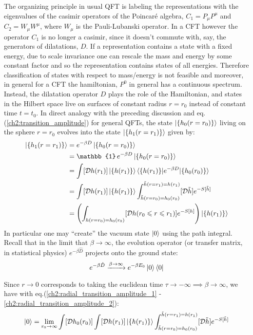   
  The organizing principle in usual QFT is labeling the representations with the eigenvalues of the casimir operators of the Poincar\'{e} algebra, $C_1=P_\mu P^\mu$ and $C_2=W_\mu W^\mu$, where $W_\mu$ is the Pauli-Lubanski operator. In a CFT however the operator $C_1$ is no longer a casimir, since it doesn't commute with, say, the generators of dilatations, $D$. If a representation contains a state with a fixed energy, due to scale invariance one can rescale the mass and energy by some constant factor and so the representation contains states of all energies. Therefore classification of states with respect to mass/energy is not feasible and moreover, in general for a CFT the hamiltonian, $P^0$ in general has a continuous spectrum. Instead, the dilatation operator $D$ plays the role of the Hamiltonian, and states in the Hilbert space live on surfaces of constant radius $r=r_0$ instead of constant time $t=t_0$. In direct analogy with the preceding discussion and eq. (\ref{ch2:transition_amplitude}) for general QFTs, the state $\ket{\{h_0(r=r_0)\}}$ living on the sphere $r=r_0$ evolves into the state $\ket{\{h_1(r=r_1)\}}$ given by:
  \begin{align} 
   \ket{\{h_1(r=r_1)\}} &= e^{-\beta D} \ket{\{h_0(r=r_0)\}} \label{ch2:radial_transition_amplitude_1} \\
			&= \mathbb{1} \, e^{-\beta D} \ket{\{h_0(r=r_0)\}} \\
			&= \int [\mathcal{D}h(r_1)] \ket{\{h(r_1)\}} \braket{\{ h(r_1)\}| e^{-\beta D} |\{h_0(r_0)\}} \\
			&= \int [\mathcal{D}h(r_1)] \ket{\{h(r_1)\}} \int_{\tilde{h}(r=r_0)=h_0(r_0)}^{\tilde{h}(r=r_1)=h(r_1)}[\mathcal{D}\tilde{h}] e^{-S[\tilde{h}]}  \\
			&= \left(\int_{h(r=r_0)=h_0(r_0)} [\mathcal{D}h(r_0 \leqslant r \leqslant r_1)] e^{-S[h]} \right) \ket{\{h(r_1)\}} \label{ch2:radial_transition_amplitude_2}
  \end{align}
  In particular one may ``create'' the vacuum state $\ket{0}$ using the path integral. Recall that in the limit that $\beta \to \infty$, the evolution operator (or transfer matrix, in statistical physics) $e^{-\beta \hat{D}}$ projects onto the ground state:
  \begin{align}
  e^{-\beta \hat{D}} \xrightarrow{\beta \to \infty} e^{-\beta E_0} \ket{0}\bra{0}
  \end{align}
  
  Since $r \to 0$ corresponds to taking the euclidean time $\tau \to -\infty \implies \beta \to \infty$, we have with eq.(\ref{ch2:radial_transition_amplitude_1} - \ref{ch2:radial_transition_amplitude_2}):
  \begin{align} 
   \ket{0} =\lim_{r_0\to \infty} \int [\mathcal{D}h_0(r_0)]\int [\mathcal{D}h(r_1)] \ket{\{h(r_1)\}} \int_{\tilde{h}(r=r_0)=h_0(r_0)}^{\tilde{h}(r=r_1)=h(r_1)}[\mathcal{D}\tilde{h}] e^{-S[\tilde{h}]} \label{ch2:radial_transition_amplitude_3}
  \end{align}
  
